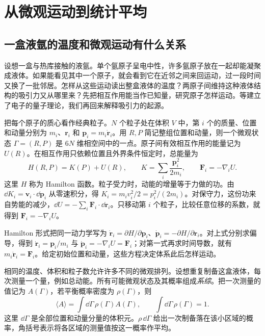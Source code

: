 \chapter{从微观运动到统计平均}
\section{一盒液氩的温度和微观运动有什么关系}
设想一盒与热库接触的液氩。单个氩原子呈电中性，许多氩原子放在一起却能凝聚成液体。如果能看见其中一个原子，就会看到它在近邻之间来回运动，过一段时间又换了一批邻居。怎样从这些运动读出整盒液体的温度？两原子间维持这种液体结构的吸引力又从哪里来？先把相互作用能当作已知量，研究原子怎样运动。等建立了电子的量子理论，我们再回来解释吸引力的起源。

把每个原子的质心看作经典粒子。$N$ 个粒子处在体积 $V$ 中，第 $i$ 个的质量、位置和动量分别为 $m_i$、$\bm r_i$ 和 $\bm p_i=m_i\dot{\bm r}_i$。用 $R,P$ 简记整组位置和动量，则一个微观状态 $\Gamma=(R,P)$ 是 $6N$ 维相空间中的一点。原子间有效相互作用的能量记为 $U(R)$。在相互作用只依赖位置且外界条件恒定时，总能量为
\begin{equation}
H(R,P)=K(P)+U(R),\qquad K=\sum_i\frac{\bm p_i^2}{2m_i},\qquad
\bm F_i=-\nabla_i U.
\end{equation}
这里 $H$ 称为 Hamilton 函数。粒子受力时，动能的增量等于力做的功。由 $\dd K_i=\bm v_i\cdot\dd\bm p_i$ 从零速积分，得 $K_i=m_i v_i^2/2=p_i^2/(2m_i)$。对保守力，这份功来自势能的减少，$\dd U=-\sum_i\bm F_i\cdot\dd\bm r_i$。只移动第 $i$ 个粒子，比较任意位移的系数，就得到 $\bm F_i=-\nabla_iU$。

Hamilton 形式把同一动力学写为 $\dot{\bm r}_i=\partial H/\partial\bm p_i$、$\dot{\bm p}_i=-\partial H/\partial\bm r_i$。对上式分别求偏导，得到 $\dot{\bm r}_i=\bm p_i/m_i$ 与 $\dot{\bm p}_i=-\nabla_iU=\bm F_i$；对第一式再求时间导数，就有 $m_i\ddot{\bm r}_i=\bm F_i$。给定初始位置和动量，这些方程决定体系此后怎样运动。

相同的温度、体积和粒子数允许许多不同的微观排列。设想重复制备这盒液体，每次测量一个量，例如总动能。所有可能微观状态及其概率组成\emph{系综}。把一次测量的值记为 $A(\Gamma)$，若平衡概率密度为 $\rho(\Gamma)$，则
\begin{equation}
\langle A\rangle=\int\dd\Gamma\,\rho(\Gamma)A(\Gamma),\qquad
\int\dd\Gamma\,\rho(\Gamma)=1.
\end{equation}
这里 $\dd\Gamma$ 是全部位置和动量分量的体积元。$\rho\,\dd\Gamma$ 给出一次制备落在该小区域的概率，角括号表示将各区域的测量值按这一概率作平均。

